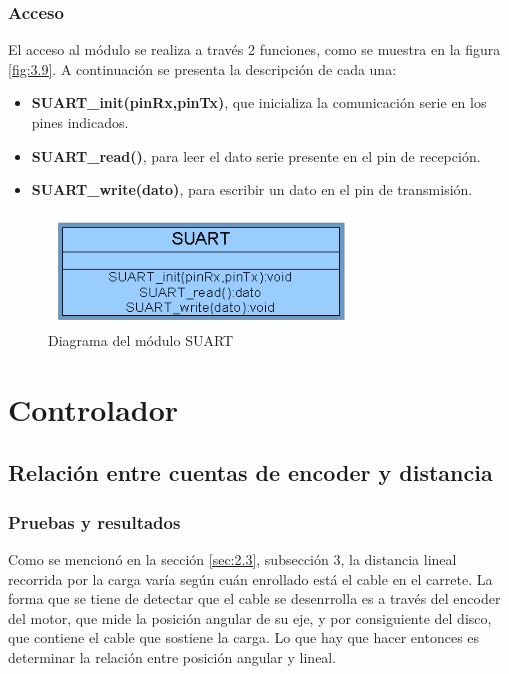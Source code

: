 \subsubsection{Acceso}

El acceso al módulo se realiza a través 2 funciones, como se muestra en la figura \ref{fig:3.9}. A continuación se presenta la descripción de cada una:
\begin{itemize}
	\item \textbf{SUART\_init(pinRx,pinTx)}, que inicializa la comunicación serie en los pines indicados.
	\item \textbf{SUART\_read()}, para leer el dato serie presente en el pin de recepción.
	\item \textbf{SUART\_write(dato)}, para escribir un dato en el pin de transmisión.
\end{itemize}

\begin{figure}[!ht]
	\centering
	\includegraphics[width=8cm,scale=1]{resources/3_9-moduloSUART.png}
	\caption{Diagrama del módulo SUART}
	\label{fig:\thefigure}
\end{figure}



\section{Controlador} \label{sec:\thesection}

\subsection{Relación entre cuentas de encoder y distancia}
\subsubsection{Pruebas y resultados}
Como se mencionó en la sección \ref{sec:2.3}, subsección 3, la distancia lineal recorrida por la carga varía según cuán enrollado está el cable en el carrete. La forma que se tiene de detectar que el cable se desenrrolla es a través del encoder del motor, que mide la posición angular de su eje, y por consiguiente del disco, que contiene el cable que sostiene la carga. Lo que hay que hacer entonces es determinar la relación entre posición angular y lineal.

